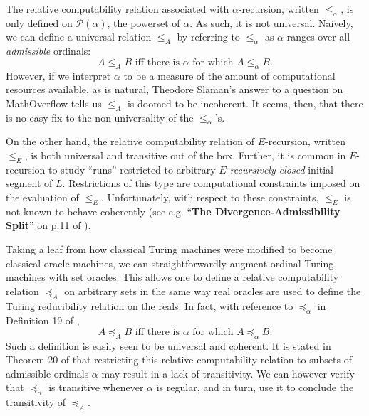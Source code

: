 \documentclass[12pt, twoside]{memoir}
\numberwithin{equation}{section}
\theoremstyle{definition}
\theoremstyle{remark}
\theoremstyle{definition}
\theoremstyle{definition}
\theoremstyle{definition}
\theoremstyle{remark}
\begin{document}
The relative computability relation associated with $\alpha$-recursion, written $\leq_{\alpha}$, is only defined on $\mathcal{P}(\alpha)$, the powerset of $\alpha$. As such, it is not universal. Naively, we can define a universal relation $\leq_A$ by referring to $\leq_{\alpha}$ as $\alpha$ ranges over all \textit{admissible} ordinals: $$A \leq_A B \text{ iff there is } \alpha \text{ for which } A \leq_{\alpha} B \text{.}$$ However, if we interpret $\alpha$ to be a measure of the amount of computational resources available, as is natural, Theodore Slaman's answer to a question on MathOverflow \cite{slaman} tells us $\leq_A$ is doomed to be incoherent. It seems, then, that there is no easy fix to the non-universality of the $\leq_{\alpha}$'s.

On the other hand, the relative computability relation of $E$-recursion, written $\leq_E$, is both universal and transitive out of the box. Further, it is common in $E$-recursion to study ``runs'' restricted to arbitrary $E$\textit{-recursively closed} initial segment of $L$. Restrictions of this type are computational constraints imposed on the evaluation of $\leq_E$. Unfortunately, with respect to these constraints, $\leq_E$ is not known to behave coherently (see e.g. ``\textbf{The Divergence-Admissibility Split}'' on p.11 of \cite{sackserec}).

Taking a leaf from how classical Turing machines were modified to become classical oracle machines, we can straightforwardly augment ordinal Turing machines with set oracles. This allows one to define a relative computability relation $\preceq_A$ on arbitrary sets in the same way real oracles are used to define the Turing reducibility relation on the reals. In fact, with reference to $\preceq_{\alpha}$ in Definition 19 of \cite{koepke2}, $$A \preceq_A B \text{ iff there is } \alpha \text{ for which } A \preceq_{\alpha} B \text{.}$$ Such a definition is easily seen to be universal and coherent. It is stated in Theorem 20 of \cite{koepke2} that restricting this relative computability relation to subsets of admissible ordinals $\alpha$ may result in a lack of transitivity. We can however verify that $\preceq_{\alpha}$ is transitive whenever $\alpha$ is regular, and in turn, use it to conclude the transitivity of $\preceq_A$.
\end{document}
